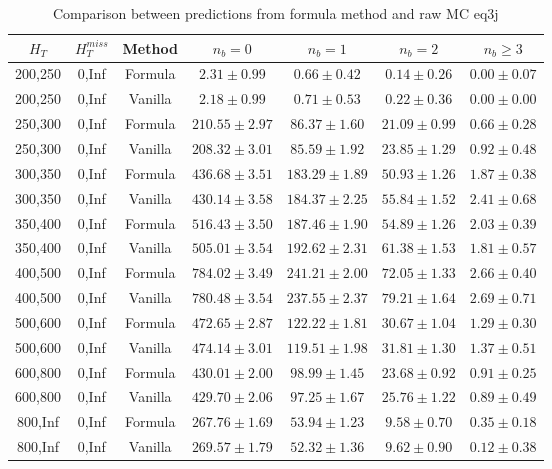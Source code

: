 \begin{longtable}{ | c | c | c | c | c | c | c | }
\caption{Comparison between predictions from formula method and raw MC eq3j} \label{tab:eq3j} \\    \hline 
$H_{T}$ & $H_{T}^{miss}$ & Method & $n_{b} = 0$ & $n_{b} = 1$ & $n_{b} = 2$ & $n_{b} \ge 3$ \\ \hline200,250 & 0,Inf & Formula  & $     2.31 \pm  0.99 $ & $     0.66 \pm  0.42 $ & $     0.14 \pm  0.26 $ & $     0.00 \pm  0.07 $  \\  
200,250 & 0,Inf & Vanilla  & $     2.18 \pm  0.99 $ & $     0.71 \pm  0.53 $ & $     0.22 \pm  0.36 $ & $     0.00 \pm  0.00 $  \\ \hline 
250,300 & 0,Inf & Formula  & $   210.55 \pm  2.97 $ & $    86.37 \pm  1.60 $ & $    21.09 \pm  0.99 $ & $     0.66 \pm  0.28 $  \\  
250,300 & 0,Inf & Vanilla  & $   208.32 \pm  3.01 $ & $    85.59 \pm  1.92 $ & $    23.85 \pm  1.29 $ & $     0.92 \pm  0.48 $  \\ \hline 
300,350 & 0,Inf & Formula  & $   436.68 \pm  3.51 $ & $   183.29 \pm  1.89 $ & $    50.93 \pm  1.26 $ & $     1.87 \pm  0.38 $  \\  
300,350 & 0,Inf & Vanilla  & $   430.14 \pm  3.58 $ & $   184.37 \pm  2.25 $ & $    55.84 \pm  1.52 $ & $     2.41 \pm  0.68 $  \\ \hline 
350,400 & 0,Inf & Formula  & $   516.43 \pm  3.50 $ & $   187.46 \pm  1.90 $ & $    54.89 \pm  1.26 $ & $     2.03 \pm  0.39 $  \\  
350,400 & 0,Inf & Vanilla  & $   505.01 \pm  3.54 $ & $   192.62 \pm  2.31 $ & $    61.38 \pm  1.53 $ & $     1.81 \pm  0.57 $  \\ \hline 
400,500 & 0,Inf & Formula  & $   784.02 \pm  3.49 $ & $   241.21 \pm  2.00 $ & $    72.05 \pm  1.33 $ & $     2.66 \pm  0.40 $  \\  
400,500 & 0,Inf & Vanilla  & $   780.48 \pm  3.54 $ & $   237.55 \pm  2.37 $ & $    79.21 \pm  1.64 $ & $     2.69 \pm  0.71 $  \\ \hline 
500,600 & 0,Inf & Formula  & $   472.65 \pm  2.87 $ & $   122.22 \pm  1.81 $ & $    30.67 \pm  1.04 $ & $     1.29 \pm  0.30 $  \\  
500,600 & 0,Inf & Vanilla  & $   474.14 \pm  3.01 $ & $   119.51 \pm  1.98 $ & $    31.81 \pm  1.30 $ & $     1.37 \pm  0.51 $  \\ \hline 
600,800 & 0,Inf & Formula  & $   430.01 \pm  2.00 $ & $    98.99 \pm  1.45 $ & $    23.68 \pm  0.92 $ & $     0.91 \pm  0.25 $  \\  
600,800 & 0,Inf & Vanilla  & $   429.70 \pm  2.06 $ & $    97.25 \pm  1.67 $ & $    25.76 \pm  1.22 $ & $     0.89 \pm  0.49 $  \\ \hline 
800,Inf & 0,Inf & Formula  & $   267.76 \pm  1.69 $ & $    53.94 \pm  1.23 $ & $     9.58 \pm  0.70 $ & $     0.35 \pm  0.18 $  \\  
800,Inf & 0,Inf & Vanilla  & $   269.57 \pm  1.79 $ & $    52.32 \pm  1.36 $ & $     9.62 \pm  0.90 $ & $     0.12 \pm  0.38 $  \\ \hline 
    \hline 
    \hline 
\end{longtable}
